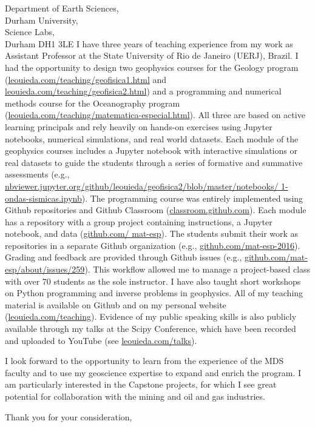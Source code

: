 \documentclass[11pt]{letter}
\begin{document}
\begin{letter}{
        Department of Earth Sciences,  \\
        Durham University, \\
        Science Labs, \\
        Durham DH1 3LE
}
I have three years of teaching experience from my work as Assistant Professor
at the State University of Rio de Janeiro (UERJ), Brazil.
I had the opportunity to design two geophysics courses for the Geology
program
(\href{http://www.leouieda.com/teaching/geofisica1.html}{leouieda.com/teaching/geofisica1.html}
and
\href{http://www.leouieda.com/teaching/geofisica2.html}{leouieda.com/teaching/geofisica2.html})
and a programming and numerical methods course for the Oceanography
program
(\href{http://www.leouieda.com/teaching/matematica-especial.html}{leouieda.com/teaching/matematica-especial.html}).
All three are based on active learning principals and rely heavily on hands-on
exercises using Jupyter notebooks, numerical simulations, and real world
datasets.
Each module of the geophysics courses includes a Jupyter notebook with
interactive simulations or real datasets to guide the students through a
series of formative and summative assessments
(e.g.,
\href{http://nbviewer.jupyter.org/github/leouieda/geofisica2/blob/master/notebooks/1-ondas-sismicas.ipynb}{nbviewer.jupyter.org/github/leouieda/geofisica2/blob/master/notebooks/ 1-ondas-sismicas.ipynb}).
The programming course was entirely implemented using Github repositories and
Github Classroom (\href{https://classroom.github.com/}{classroom.github.com}).
Each module has a repository with a group project containing instructions, a
Jupyter notebook, and data
(\href{https://github.com/mat-esp}{github.com/ mat-esp}).
The students submit their work as repositories in a separate Github
organization
(e.g., \href{https://github.com/mat-esp-2016}{github.com/mat-esp-2016}).
Grading and feedback are provided through Github issues (e.g.,
\href{https://github.com/mat-esp/about/issues/259}{github.com/mat-esp/about/issues/259}).
This workflow allowed me to manage a project-based class with over 70 students
as the sole instructor.
I have also taught short workshops on Python programming and inverse problems
in geophysics.
All of my teaching material is available on Github and on my personal website
(\href{http://www.leouieda.com/teaching/}{leouieda.com/teaching}).
Evidence of my public speaking skills is also publicly available through my
talks at the Scipy Conference, which have been recorded and uploaded to YouTube
(see \href{http://www.leouieda.com/talks/}{leouieda.com/talks}).

I look forward to the opportunity to learn from the experience of the MDS
faculty and to use my geoscience expertise to expand and enrich the program.
I am particularly interested in the Capstone projects, for which I see great
potential for collaboration with the mining and oil and gas industries.

\closing{Thank you for your consideration,}


\end{letter}
\end{document}
